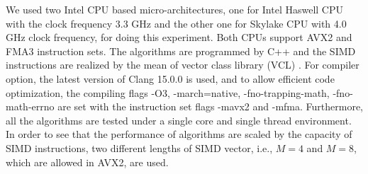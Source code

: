 We used two Intel CPU based micro-architectures, one for Intel Haswell CPU with the clock frequency 3.3 GHz
and the other one for Skylake CPU with 4.0 GHz clock frequency, for doing this experiment.
Both CPUs support AVX2 and FMA3 instruction sets. 
The algorithms are programmed by C++ and the SIMD instructions are realized
by the mean of vector class library (VCL) \cite{Agner_04}.
For compiler option, the latest version of Clang 15.0.0
is used, and to allow efficient code optimization, 
the compiling flags -O3, -march=native, -fno-trapping-math, -fno-math-errno are set with the instruction set flags -mavx2 and -mfma. 
Furthermore, all the algorithms are tested under a single core and single thread environment.
In order to see that the performance of algorithms are scaled by the capacity of SIMD instructions, two 
different lengths of SIMD vector, i.e., $M=4$ and $M=8$, which are allowed in AVX2, are used. 

